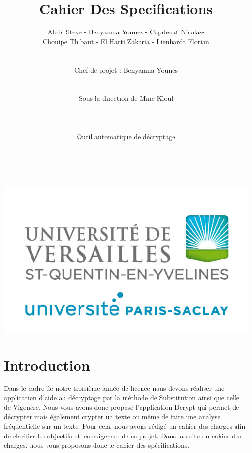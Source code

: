 \documentclass[a4]{article}
\begin{document}
	\title{\Huge{\textbf{Cahier Des Specifications}}}
	\author{Alabi Steve - Benyamna Younes - Capdenat Nicolas- \\
		Chouipe Thibaut - El Harti Zakaria - Lienhardt Florian \\ \\ \\
		Chef de projet : Benyamna Younes \\ \\ \\ 
		Sous la direction de Mme Kloul \\ \\ \\ \\
		Outil automatique de décryptage \\ \\ \\}
		

	\begin{titlepage}
		\maketitle
		\vspace{20em}
		\begin{center}\includegraphics{logo_uvsq.jpg}\end{center}
	\end{titlepage}
	\section{Introduction}
Dans le cadre de notre troisième année de licence nous devons réaliser une application d'aide au
décryptage par la méthode de Substitution ainsi que celle de Vigenère.
Nous vous avons donc proposé l'application Dcrypt qui permet de décrypter 
mais également crypter un texte ou même de faire une analyse fréquentielle sur un texte.
Pour cela, nous avons rédigé un cahier des charges afin de clarifier les objectifs et les 
exigences de ce projet. Dans la suite du cahier des charges, nous vous proposons donc
le cahier des spécifications.
\end{document}
